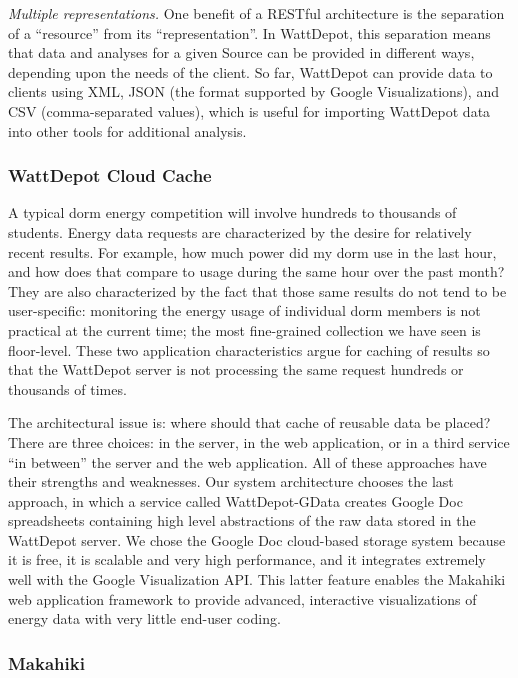 {\em Multiple representations.} One benefit of a RESTful architecture is
the separation of a ``resource'' from its ``representation''.  In
WattDepot, this separation means that data and analyses for a given Source can
be provided in different ways, depending upon the needs of the client.  So
far, WattDepot can provide data to clients using XML, JSON (the format
supported by Google Visualizations), and CSV (comma-separated values),
which is useful for importing WattDepot data into other tools for
additional analysis.

\subsubsection{WattDepot Cloud Cache}

A typical dorm energy competition will involve hundreds to thousands of
students.  Energy data requests are characterized by the desire for
relatively recent results. For example, how much power did my dorm use in
the last hour, and how does that compare to usage during the same hour over
the past month? They are also characterized by the fact that those same
results do not tend to be user-specific: monitoring the energy usage of
individual dorm members is not practical at the current time; the most
fine-grained collection we have seen is floor-level. These two application
characteristics argue for caching of results so that the WattDepot server
is not processing the same request hundreds or thousands of times.

The architectural issue is: where should that cache of reusable data be
placed?  There are three choices: in the server, in the web application, or
in a third service ``in between'' the server and the web application.
All of these approaches have their strengths and weaknesses.  Our system
architecture chooses the last approach, in which a service called
WattDepot-GData creates Google Doc spreadsheets containing high level
abstractions of the raw data stored in the WattDepot server.  We chose the
Google Doc cloud-based storage system because it is free, it is scalable
and very high performance, and it integrates extremely well with the Google
Visualization API.  This latter feature enables the Makahiki web
application framework to provide advanced, interactive visualizations of
energy data with very little end-user coding.

\subsubsection{Makahiki}

